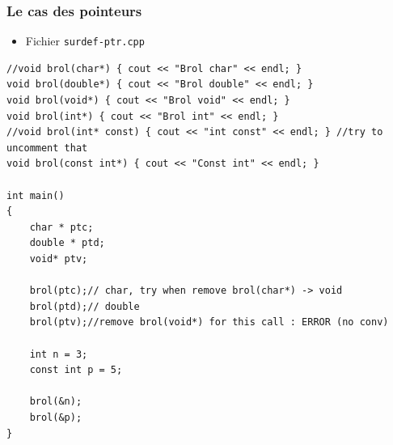 \begin{frame}[containsverbatim]
\frametitle{Le cas des pointeurs}
\begin{itemize}
\item Fichier \texttt{surdef-ptr.cpp}
\end{itemize}
\begin{lstlisting}
//void brol(char*) { cout << "Brol char" << endl; }
void brol(double*) { cout << "Brol double" << endl; }
void brol(void*) { cout << "Brol void" << endl; }
void brol(int*) { cout << "Brol int" << endl; }
//void brol(int* const) { cout << "int const" << endl; } //try to uncomment that
void brol(const int*) { cout << "Const int" << endl; }

int main()
{
	char * ptc;
	double * ptd;
	void* ptv;
	
	brol(ptc);// char, try when remove brol(char*) -> void
	brol(ptd);// double		
	brol(ptv);//remove brol(void*) for this call : ERROR (no conv)

	int n = 3;
	const int p = 5;

	brol(&n);
	brol(&p);		
}
\end{lstlisting}
\end{frame}

